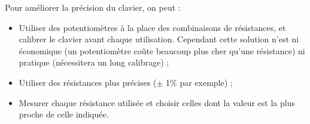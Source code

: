 Pour améliorer la précision du clavier, on peut :
\begin{itemize}
	\item Utiliser des potentiomètres à la place des combinaisons
	de résistances, et calibrer le clavier avant chaque utilisation.
	Cependant cette solution n'est ni économique (un potentiomètre
	coûte beaucoup plus cher qu'une résistance) ni pratique (nécessitera
	un long calibrage) ;
	\item Utiliser des résistances plus précises ($\pm$ 1\% par exemple) ;
	\item Mesurer chaque résistance utilisée et choisir celles dont la
	valeur est la plus proche de celle indiquée.
\end{itemize}


